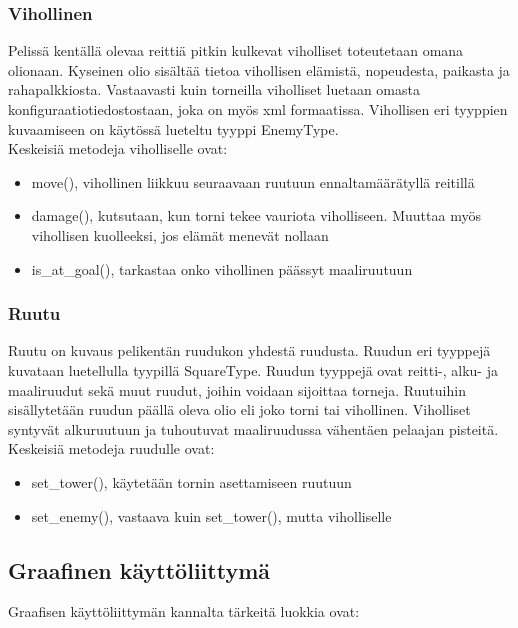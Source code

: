 \documentclass{article}
\begin{document}
\subsubsection{Vihollinen}

\noindent Pelissä kentällä olevaa reittiä pitkin kulkevat viholliset toteutetaan omana olionaan. Kyseinen olio sisältää tietoa vihollisen elämistä, nopeudesta, paikasta ja rahapalkkiosta. Vastaavasti kuin torneilla viholliset luetaan omasta konfiguraatiotiedostostaan, joka on myös xml formaatissa. Vihollisen eri tyyppien kuvaamiseen on käytössä lueteltu tyyppi EnemyType. \\

\noindent Keskeisiä metodeja viholliselle ovat:
\begin{itemize}
    \item move(), vihollinen liikkuu seuraavaan ruutuun ennaltamäärätyllä reitillä
    \item damage(), kutsutaan, kun torni tekee vauriota viholliseen. Muuttaa myös vihollisen kuolleeksi, jos elämät menevät nollaan
    \item is\_at\_goal(), tarkastaa onko vihollinen päässyt maaliruutuun
\end{itemize}

\subsubsection{Ruutu}

\noindent Ruutu on kuvaus pelikentän ruudukon yhdestä ruudusta. Ruudun eri tyyppejä kuvataan luetellulla tyypillä SquareType. Ruudun tyyppejä ovat reitti-, alku- ja maaliruudut sekä muut ruudut, joihin voidaan sijoittaa torneja. Ruutuihin sisällytetään ruudun päällä oleva olio eli joko torni tai vihollinen. Viholliset syntyvät alkuruutuun ja tuhoutuvat maaliruudussa vähentäen pelaajan pisteitä. \\

\noindent Keskeisiä metodeja ruudulle ovat:
\begin{itemize}
    \item set\_tower(), käytetään tornin asettamiseen ruutuun
    \item set\_enemy(), vastaava kuin set\_tower(), mutta viholliselle
\end{itemize}

\subsection{Graafinen käyttöliittymä}
Graafisen käyttöliittymän kannalta tärkeitä luokkia ovat:
\end{document}
